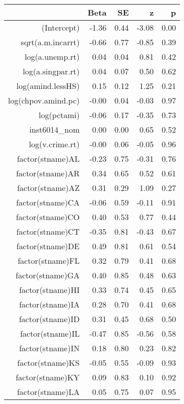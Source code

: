 \begin{table}[ht]
\centering
\begin{tabular}{rrrrr}
  \hline
 & Beta & SE & z & p \\ 
  \hline
(Intercept) & -1.36 & 0.44 & -3.08 & 0.00 \\ 
  sqrt(a.m.incarrt) & -0.66 & 0.77 & -0.85 & 0.39 \\ 
  log(a.unemp.rt) & 0.04 & 0.04 & 0.81 & 0.42 \\ 
  log(a.singpar.rt) & 0.04 & 0.07 & 0.50 & 0.62 \\ 
  log(amind.lessHS) & 0.15 & 0.12 & 1.25 & 0.21 \\ 
  log(chpov.amind.pc) & -0.00 & 0.04 & -0.03 & 0.97 \\ 
  log(pctami) & -0.06 & 0.17 & -0.35 & 0.73 \\ 
  inst6014\_nom & 0.00 & 0.00 & 0.65 & 0.52 \\ 
  log(v.crime.rt) & -0.00 & 0.06 & -0.05 & 0.96 \\ 
  factor(stname)AL & -0.23 & 0.75 & -0.31 & 0.76 \\ 
  factor(stname)AR & 0.34 & 0.65 & 0.52 & 0.61 \\ 
  factor(stname)AZ & 0.31 & 0.29 & 1.09 & 0.27 \\ 
  factor(stname)CA & -0.06 & 0.59 & -0.11 & 0.91 \\ 
  factor(stname)CO & 0.40 & 0.53 & 0.77 & 0.44 \\ 
  factor(stname)CT & -0.35 & 0.81 & -0.43 & 0.67 \\ 
  factor(stname)DE & 0.49 & 0.81 & 0.61 & 0.54 \\ 
  factor(stname)FL & 0.32 & 0.79 & 0.41 & 0.68 \\ 
  factor(stname)GA & 0.40 & 0.85 & 0.48 & 0.63 \\ 
  factor(stname)HI & 0.33 & 0.74 & 0.45 & 0.65 \\ 
  factor(stname)IA & 0.28 & 0.70 & 0.41 & 0.68 \\ 
  factor(stname)ID & 0.31 & 0.45 & 0.68 & 0.50 \\ 
  factor(stname)IL & -0.47 & 0.85 & -0.56 & 0.58 \\ 
  factor(stname)IN & 0.18 & 0.80 & 0.23 & 0.82 \\ 
  factor(stname)KS & -0.05 & 0.55 & -0.09 & 0.93 \\ 
  factor(stname)KY & 0.09 & 0.83 & 0.10 & 0.92 \\ 
  factor(stname)LA & 0.05 & 0.75 & 0.07 & 0.95 \\ 

\end{tabular}
\end{table}
